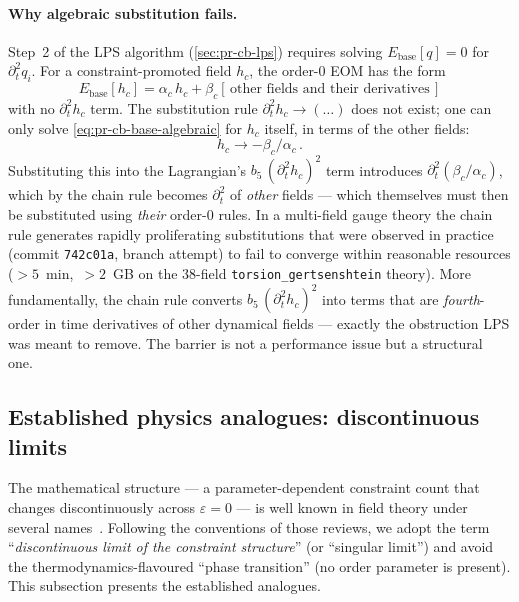 \paragraph{Why algebraic substitution fails.}
Step~2 of the LPS algorithm (\cref{sec:pr-cb-lps}) requires solving
$E_{\mathrm{base}}[q] = 0$ for $\partial_t^2 q_i$.  For a constraint-promoted
field $h_c$, the order-0 EOM has the form
\begin{equation}
  E_{\mathrm{base}}[h_c] = \alpha_c\, h_c + \beta_c[\,\text{other fields and their derivatives}\,]
  \label{eq:pr-cb-base-algebraic}
\end{equation}
with no $\partial_t^2 h_c$ term.  The substitution rule
$\partial_t^2 h_c \to (\dots)$ does not exist; one can only solve
\eqref{eq:pr-cb-base-algebraic} for $h_c$ itself, in terms of the other
fields:
\begin{equation}
  h_c \to -\beta_c / \alpha_c \,.
\end{equation}
Substituting this into the Lagrangian's $b_5\,(\partial_t^2 h_c)^2$ term
introduces $\partial_t^2(\beta_c/\alpha_c)$, which by the chain rule becomes
$\partial_t^2$ of \emph{other} fields --- which themselves must then be
substituted using \emph{their} order-0 rules.  In a multi-field gauge
theory the chain rule generates rapidly proliferating substitutions that
were observed in practice (commit \texttt{742c01a}, branch attempt) to
fail to converge within reasonable resources ($> 5$~min,~$> 2$~GB on the
38-field \texttt{torsion\_gertsenshtein} theory).  More fundamentally, the
chain rule converts $b_5\,(\partial_t^2 h_c)^2$ into terms that are
\emph{fourth}-order in time derivatives of other dynamical fields ---
exactly the obstruction LPS was meant to remove.  The barrier is
not a performance issue but a structural one.

\subsection{Established physics analogues: discontinuous limits}
\label{sec:pr-cb-analogues}

The mathematical structure --- a parameter-dependent constraint count that
changes discontinuously across $\varepsilon = 0$ --- is well known in
field theory under several names~\cite{deRham2014,Hinterbichler2012}.
Following the conventions of those reviews, we adopt the term
``\emph{discontinuous limit of the constraint structure}'' (or
``singular limit'') and avoid the thermodynamics-flavoured ``phase
transition'' (no order parameter is present).  This subsection presents
the established analogues.

